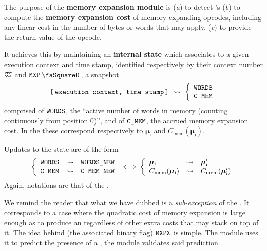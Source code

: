 The purpose of the \textbf{memory expansion module} is
(\emph{a}) to detect \mxpxSH{}'s
(\emph{b}) to compute the \textbf{memory expansion cost} of memory expanding opcodes, including any linear cost in the number of bytes or words that may apply,
(\emph{c}) to provide the return value of the  opcode.

It achieves this by maintaining an \textbf{internal state} which associates to a given
execution context and time stamp,
identified respectively by their context number $\texttt{CN}$ and $\mxpStamp$,
a snapshot
\[
	\texttt{[\,execution context, time stamp\,]}
	~ \rightsquigarrow ~
	\left\{ \begin{array}{l}
		\texttt{WORDS} \\
		\texttt{C\_MEM}  \\
	\end{array} \right.
\]
comprised of
$\texttt{WORDS}$, the ``active number of words in memory (counting continuously from position $0$)'', and of
$\texttt{C\_MEM}$,  the accrued memory expansion cost.
In the \cite{EYP-London} these correspond respectively to $\bm{\mu}_\text{i}$ and $C_\text{mem}(\bm{\mu}_\text{i})$.

Updates to the state are of the form
\[
	\left\{ \begin{array}{lcl}
		\texttt{WORDS} & \rightsquigarrow & \texttt{WORDS\_NEW} \\
		\texttt{C\_MEM}  & \rightsquigarrow & \texttt{C\_MEM\_NEW}  \\
	\end{array} \right.
	\iff
	\left\{ \begin{array}{lcl}
		\bm{\mu}_\text{i}               & \rightsquigarrow & \bm{\mu}_\text{i}'               \\
		C_\text{mem}(\bm{\mu}_\text{i}) & \rightsquigarrow & C_\text{mem}(\bm{\mu}_\text{i}') \\
	\end{array} \right.
\]
Again, notations are that of the \cite{EYP-London}.

We remind the reader that what we have dubbed \mxpxSH{} is a \emph{sub-exception} of the \oogxSH{}.
It corresponds to a case where the quadratic cost of memory expansion is large enough as to produce an \oogxSH{} regardless of other extra costs that may stack on top of it.
The idea behind (the associated binary flag) $\texttt{MXPX}$ is simple.
The \hubMod{} module uses it to predict the presence of a \mxpxSH{}, the \mxpMod{} module validates said prediction.

